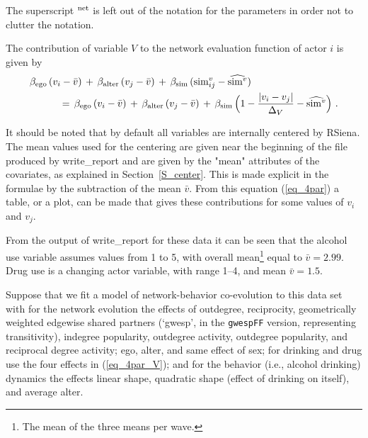 \documentclass[a4paper,fleqn,11pt]{article}
\newcommand{\+}{\, + \,}
\newcommand{\sfn}[1]{\textsf{#1}}
\newcommand{\rs}{{\sf RSiena}}
\begin{document}
The superscript $^{\rm net}$ is left out of the notation for the parameters
in order not to clutter the notation.

The contribution of variable $V$ to the
network evaluation function of actor $i$ is given by
\begin{align}
  &  \beta_{\rm ego}\, (v_i - \bar v)
                \, + \, \beta_{\rm alter}\,  (v_j - \bar v) \, + \,
   \beta_{\rm sim} \, ({\rm sim}^v_{ij} - \widehat{{\rm sim}^v} ) \nonumber \\
 & \hspace{3em} = \, \beta_{\rm ego}\, (v_i - \bar v)
              \, + \, \beta_{\rm alter}\,  (v_j - \bar v) \, + \,
        \beta_{\rm sim} \,  \Big( 1 - \frac{\vert v_i - v_j \vert}{\Delta_V}
                     - \widehat{{\rm sim}^v} \Big) \ .
                 \label{eq_sel}
\end{align}
\fi

It should be noted that by default all variables are internally centered by \rs.
The mean values used for the centering
are given near the beginning of the file produced by
\sfn{write\_report} and are given by the \textsf{"mean"}
attributes of the covariates, as explained in
Section~\ref{S_center}.
This is made explicit in the formulae by the subtraction
of the mean $\bar v$.
From this equation (\ref{eq_4par}) a table, or a plot, can be made
that gives these contributions for some values of $v_i$ and $v_j$.

From the output of \sfn{write\_report} for these data it can be seen that
the alcohol use variable assumes values from 1 to 5, with overall
mean\footnote{The mean of the three means per wave.}
equal to $\bar v = 2.99$.
Drug use is a changing actor variable, with
range 1--4, and mean $\bar v = 1.5$.

Suppose that we fit a model of network-behavior co-evolution to this data set
with for the network evolution the effects of outdegree, reciprocity,
geometrically weighted edgewise shared partners (`gwesp', in the
\texttt{gwespFF} version, representing transitivity),
indegree popularity, outdegree activity, outdegree popularity,
and reciprocal degree activity; ego, alter, and same effect of sex;
for drinking and drug use the four effects in (\ref{eq_4par_V});
and for the  behavior (i.e., alcohol drinking) dynamics the
effects linear shape, quadratic shape (effect of drinking on itself),
and average alter.
\end{document}

